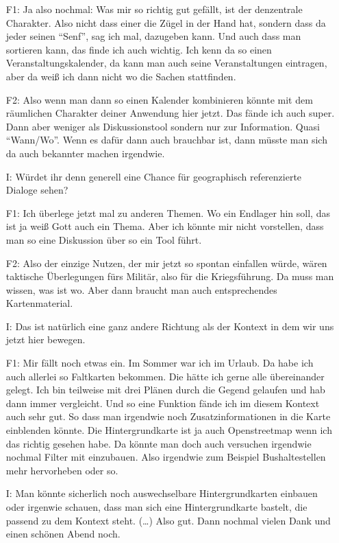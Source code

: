 \begin{itemize}
    \item[F1:] Ja also nochmal: Was mir so richtig gut gefällt, ist der denzentrale Charakter. Also nicht dass einer die Zügel in der Hand hat, sondern dass da jeder seinen "`Senf"', sag ich mal, dazugeben kann. Und auch dass man sortieren kann, das finde ich auch wichtig. Ich kenn da so einen Veranstaltungskalender, da kann man auch seine Veranstaltungen eintragen, aber da weiß ich dann nicht wo die Sachen stattfinden.
    \item[F2:] Also wenn man dann so einen Kalender kombinieren könnte mit dem räumlichen Charakter deiner Anwendung hier jetzt. Das fände ich auch super. Dann aber weniger als Diskussionstool sondern nur zur Information. Quasi "`Wann/Wo"'. Wenn es dafür dann auch brauchbar ist, dann müsste man sich da auch bekannter machen irgendwie.
    \item[I:] Würdet ihr denn generell eine Chance für geographisch referenzierte Dialoge sehen?
    \item[F1:] Ich überlege jetzt mal zu anderen Themen. Wo ein Endlager hin soll, das ist ja weiß Gott auch ein Thema. Aber ich könnte mir nicht vorstellen, dass man so eine Diskussion über so ein Tool führt.
    \item[F2:] Also der einzige Nutzen, der mir jetzt so spontan einfallen würde, wären taktische {\"U}berlegungen fürs Militär, also für die Kriegsführung. Da muss man wissen, was ist wo. Aber dann braucht man auch entsprechendes Kartenmaterial.
    \item[I:] Das ist natürlich eine ganz andere Richtung als der Kontext in dem wir uns jetzt hier bewegen.
    \item[F1:] Mir fällt noch etwas ein. Im Sommer war ich im Urlaub. Da habe ich auch allerlei so Faltkarten bekommen. Die hätte ich gerne alle übereinander gelegt. Ich bin teilweise mit drei Plänen durch die Gegend gelaufen und hab dann immer vergleicht. Und so eine Funktion fände ich im diesem Kontext auch sehr gut. So dass man irgendwie noch Zusatzinformationen in die Karte einblenden könnte. Die Hintergrundkarte ist ja auch Openstreetmap wenn ich das richtig gesehen habe. Da könnte man doch auch versuchen irgendwie nochmal Filter mit einzubauen. Also irgendwie zum Beispiel Bushaltestellen mehr hervorheben oder so.
    \item[I:] Man könnte sicherlich noch auswechselbare Hintergrundkarten einbauen oder irgenwie schauen, dass man sich eine Hintergrundkarte bastelt, die passend zu dem Kontext steht. (\dots) Also gut. Dann nochmal vielen Dank und einen schönen Abend noch.
\end{itemize}